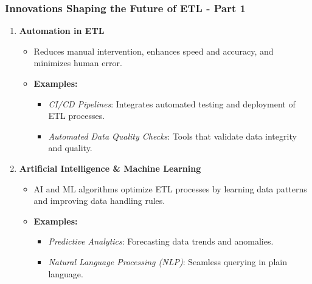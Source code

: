 \documentclass[aspectratio=169]{beamer}
\begin{document}
\begin{frame}[fragile]
    \frametitle{Innovations Shaping the Future of ETL - Part 1}
    \begin{enumerate}
        \item \textbf{Automation in ETL}
        \begin{itemize}
            \item Reduces manual intervention, enhances speed and accuracy, and minimizes human error.
            \item \textbf{Examples:}
            \begin{itemize}
                \item \textit{CI/CD Pipelines}: Integrates automated testing and deployment of ETL processes.
                \item \textit{Automated Data Quality Checks}: Tools that validate data integrity and quality.
            \end{itemize}
        \end{itemize}        
        \item \textbf{Artificial Intelligence \& Machine Learning}
        \begin{itemize}
            \item AI and ML algorithms optimize ETL processes by learning data patterns and improving data handling rules.
            \item \textbf{Examples:}
            \begin{itemize}
                \item \textit{Predictive Analytics}: Forecasting data trends and anomalies.
                \item \textit{Natural Language Processing (NLP)}: Seamless querying in plain language.
            \end{itemize}
        \end{itemize}        
    \end{enumerate}
\end{frame}
\end{document}
